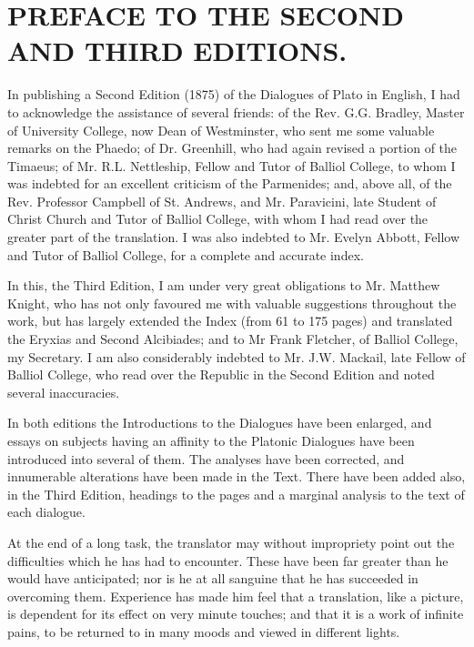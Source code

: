 \documentclass[11pt,letter]{article}
\begin{document}
\par 
\section{
      PREFACE TO THE SECOND AND THIRD EDITIONS.
    }
\par  In publishing a Second Edition (1875) of the Dialogues of Plato in English, I had to acknowledge the assistance of several friends: of the Rev. G.G. Bradley, Master of University College, now Dean of Westminster, who sent me some valuable remarks on the Phaedo; of Dr. Greenhill, who had again revised a portion of the Timaeus; of Mr. R.L. Nettleship, Fellow and Tutor of Balliol College, to whom I was indebted for an excellent criticism of the Parmenides; and, above all, of the Rev. Professor Campbell of St. Andrews, and Mr. Paravicini, late Student of Christ Church and Tutor of Balliol College, with whom I had read over the greater part of the translation. I was also indebted to Mr. Evelyn Abbott, Fellow and Tutor of Balliol College, for a complete and accurate index.

\par  In this, the Third Edition, I am under very great obligations to Mr. Matthew Knight, who has not only favoured me with valuable suggestions throughout the work, but has largely extended the Index (from 61 to 175 pages) and translated the Eryxias and Second Alcibiades; and to Mr Frank Fletcher, of Balliol College, my Secretary. I am also considerably indebted to Mr. J.W. Mackail, late Fellow of Balliol College, who read over the Republic in the Second Edition and noted several inaccuracies.

\par  In both editions the Introductions to the Dialogues have been enlarged, and essays on subjects having an affinity to the Platonic Dialogues have been introduced into several of them. The analyses have been corrected, and innumerable alterations have been made in the Text. There have been added also, in the Third Edition, headings to the pages and a marginal analysis to the text of each dialogue.

\par  At the end of a long task, the translator may without impropriety point out the difficulties which he has had to encounter. These have been far greater than he would have anticipated; nor is he at all sanguine that he has succeeded in overcoming them. Experience has made him feel that a translation, like a picture, is dependent for its effect on very minute touches; and that it is a work of infinite pains, to be returned to in many moods and viewed in different lights.
\end{document}
